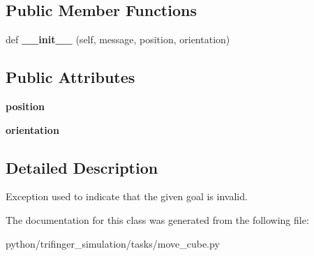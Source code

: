 \subsection*{Public Member Functions}
\begin{DoxyCompactItemize}
\item 
\mbox{\label{classtrifinger__simulation_1_1tasks_1_1move__cube_1_1InvalidGoalError_a615089ce5f1379b4c176cb13848fa4cf}} 
def {\bfseries \+\_\+\+\_\+init\+\_\+\+\_\+} (self, message, position, orientation)
\end{DoxyCompactItemize}
\subsection*{Public Attributes}
\begin{DoxyCompactItemize}
\item 
\mbox{\label{classtrifinger__simulation_1_1tasks_1_1move__cube_1_1InvalidGoalError_a1f31c828b3dc9464138709c5a9e8a7d4}} 
{\bfseries position}
\item 
\mbox{\label{classtrifinger__simulation_1_1tasks_1_1move__cube_1_1InvalidGoalError_ab4318be287d0fea40510bef529ef540a}} 
{\bfseries orientation}
\end{DoxyCompactItemize}


\subsection{Detailed Description}
Exception used to indicate that the given goal is invalid. 



The documentation for this class was generated from the following file\+:\begin{DoxyCompactItemize}
\item 
python/trifinger\+\_\+simulation/tasks/move\+\_\+cube.\+py\end{DoxyCompactItemize}
